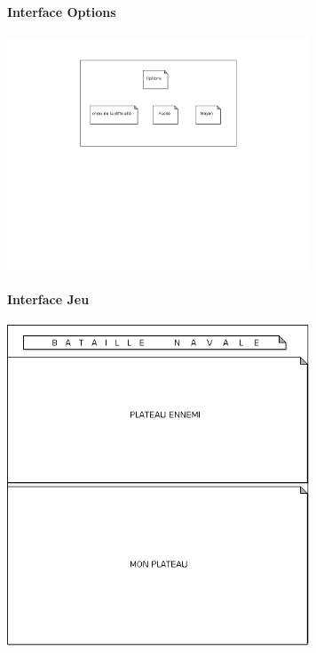 \documentclass[a4paper,oneside]{article}
\begin{document}
\paragraph{Interface Options\\}

\includegraphics[width=9cm]{maquette_options.png}



\paragraph{Interface Jeu\\}

\includegraphics[width=9cm]{maquette_jeu.png}










\label{fin}
\end{document}
